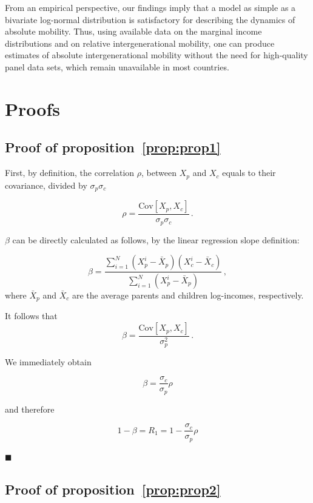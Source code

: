 \documentclass[12pt,a4paper]{article}
\newcommand*{\qed}{\hfill\ensuremath{\blacksquare}}%
\newcommand{\preflong}[1]{proposition~\ref{prop:#1}}
\newcommand{\be}{\begin{equation}}
\newcommand{\ee}{\end{equation}}
\numberwithin{equation}{section}
\begin{document}
From an empirical perspective, our findings imply that a model as simple as a bivariate log-normal distribution is satisfactory for describing the dynamics of absolute mobility. Thus, using available data on the marginal income distributions and on relative intergenerational mobility, one can produce estimates of absolute intergenerational mobility without the need for high-quality panel data sets, which remain unavailable in most countries.

\clearpage

\doublespacing


\clearpage


\appendix

\section{Proofs}
\label{app:appA}

\subsection{Proof of \preflong{prop1}}

First, by definition, the correlation $\rho$, between $X_p$ and $X_c$ equals to their covariance, divided by $\sigma_p\sigma_c$

\be
\rho = \frac{\text{Cov}\left[X_p,X_c\right]}{\sigma_p\sigma_c}\,.
\ee

$\beta$ can be directly calculated as follows, by the linear regression slope definition:

\be
\beta = \frac{\sum_{i=1}^{N} {\left(X_p^i - \bar{X}_p\right)\left(X_c^i - \bar{X}_c\right)}}{\sum_{i=1}^{N} {\left(X_p^i - \bar{X}_p\right)}}\,,
\ee
where $\bar{X}_p$ and $\bar{X}_c$ are the average parents and children log-incomes, respectively.

It follows that 
\be
\beta = \frac{\text{Cov}\left[X_p,X_c\right]}{\sigma_p^2}\,.
\ee

We immediately obtain

\be
\beta = \frac{\sigma_c}{\sigma_p}\rho
\ee

and therefore

\be
1-\beta = R_1 = 1-\frac{\sigma_c}{\sigma_p}\rho
\ee

\qed

\subsection{Proof of \preflong{prop2}}
\end{document}

